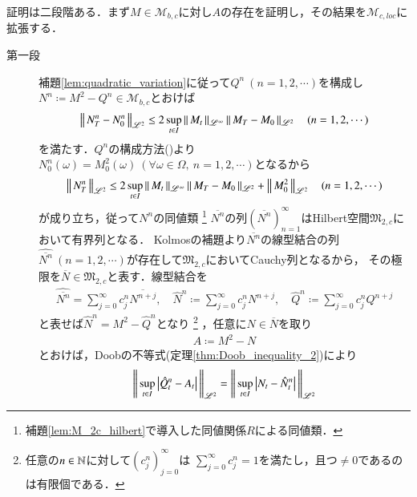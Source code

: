 	\begin{prf}
		証明は二段階ある．まず$M \in \mathcal{M}_{b,c}$に対し$A$の存在を証明し，その結果を$\mathcal{M}_{c,loc}$に拡張する．
		\begin{description}
			\item[第一段]
				補題\ref{lem:quadratic_variation}に従って$Q^n\ (n=1,2,\cdots)$を構成し
				$N^n \coloneqq M^2 - Q^n \in \mathcal{M}_{b,c}$とおけば
				\begin{align}
					\left\|\, N_T^n - N_0^n\, \right\|_{\mathscr{L}^2} \leq 2 \operatorname*{sup}_{t \in I} \left\|\, M_t\, \right\|_{\mathscr{L}^\infty} \left\|\, M_T - M_0\, \right\|_{\mathscr{L}^2} \quad (n=1,2,\cdots)
				\end{align}
				を満たす．$Q^n$の構成方法()より$N_0^n(\omega) = M^2_0(\omega)\ (\forall \omega \in \Omega,\ n=1,2,\cdots)$となるから
				\begin{align}
					\left\|\, N_T^n\, \right\|_{\mathscr{L}^2} 
					\leq 2 \operatorname*{sup}_{t \in I} \left\|\, M_t\, \right\|_{\mathscr{L}^\infty} \left\|\, M_T - M_0\, \right\|_{\mathscr{L}^2} + \left\|\, M^2_0\, \right\|_{\mathscr{L}^2} \quad (n=1,2,\cdots)
				\end{align}
				が成り立ち，従って$N^n$の同値類
				\footnote{
					補題\ref{lem:M_2c_hilbert}で導入した同値関係$R$による同値類．
				}
				$\overline{N^n}$の列$(\overline{N^n})_{n=1}^{\infty}$はHilbert空間$\mathfrak{M}_{2,c}$において有界列となる．
				Kolmosの補題より$\overline{N^n}$の線型結合の列$\hat{\overline{N^n}}\ (n=1,2,\cdots)$が存在して$\mathfrak{M}_{2,c}$においてCauchy列となるから，
				その極限を$\overline{N} \in \mathfrak{M}_{2,c}$と表す．線型結合を
				\begin{align}
					\hat{\overline{N^n}} = \sum_{j=0}^{\infty} c^n_j \overline{N^{n+j}}, \quad
					\hat{N}^n \coloneqq \sum_{j=0}^{\infty} c^n_j N^{n+j}, \quad
					\hat{Q}^n \coloneqq \sum_{j=0}^{\infty} c^n_j Q^{n+j}
				\end{align}
				と表せば$\hat{N}^n = M^2 - \hat{Q}^n$となり
				\footnote{
					任意の$n \in \mathbb{N}$に対して$(c^n_j)_{j=0}^{\infty}$は
					$\sum_{j=0}^{\infty} c^n_j = 1$を満たし，且つ$\neq 0$であるのは有限個である．
				}
				，任意に$N \in \overline{N}$を取り
				\begin{align}
					A \coloneqq M^2 - N \label{eq:thm_quadratic_variation_0}
				\end{align}
				とおけば，Doobの不等式(定理\ref{thm:Doob_inequality_2})により
				\begin{align}
					\Norm{\sup{t \in I}{\left| \hat{Q}_t^n - A_t \right|}}{\mathscr{L}^2}
					&= \Norm{\sup{t \in I}{\left| N_t - \hat{N}_t^n \right|}}{\mathscr{L}^2} \\

\end{align}
\end{description}
\end{prf}

